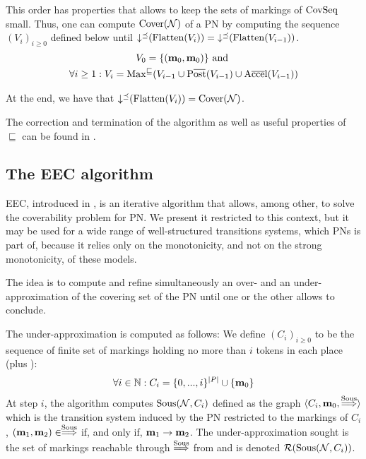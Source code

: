 This order has properties \citep{Geeraerts07} that allows to keep the sets of markings of $\operatorname{CovSeq}$ small.
Thus, one can compute $\operatorname{Cover}(\mathcal{N})$ of a \ac{PN} \NPTm by computing the sequence $(V_i)_{i \geq 0}$ defined below until $\operatorname{\downarrow^\preceq}(\operatorname{Flatten}(V_i)) = \operatorname{\downarrow^\preceq}(\operatorname{Flatten}(V_{i-1}))$.
\begin{gather*}
  V_0 = \{(\mari, \mari)\} \text{ and } \\
  \forall i \geq 1 : V_i = \Maxs(V_{i-1} \cup \Postb(V_{i-1}) \cup \Accelb(V_{i-1}))
\end{gather*}

At the end, we have that $\operatorname{\downarrow^\preceq}(\operatorname{Flatten}(V_i)) = \operatorname{Cover}(\mathcal{N})$.

The correction and termination of the algorithm as well as useful properties of $\sqsubseteq$ can be found in \cite{Geeraerts07, Ganty09}.

\subsection{The \ac{EEC} algorithm}
\label{sec:eec}

\ac{EEC}, introduced in \cite{Geeraerts07thesis, Geeraerts06}, is an iterative algorithm that allows, among other, to solve the coverability problem for \ac{PN}.
We present it restricted to this context, but it may be used for a wide range of well-structured transitions systems, which \acp{PN} is part of, because it relies only on the monotonicity, and not on the strong monotonicity, of these models.

The idea is to compute and refine simultaneously an over- and an under-approximation of the covering set of the \ac{PN} until one or the other allows to conclude.

The under-approximation is computed as follows:
We define $(C_i)_{i \geq 0}$ to be the sequence of finite set of markings holding no more than $i$ tokens in each place (plus \mari):
\[
  \forall i \in \mathbb{N} : C_i = \{0, ..., i\}^{|P|} \cup \{\mathbf{m}_0\}
\]
At step $i$, the algorithm computes $\operatorname{Sous}(\mathcal{N}, C_i)$ defined as the graph $\langle C_i, \mathbf{m}_0, \stackrel{\operatorname{Sous}}{\Longrightarrow} \rangle$ which is the transition system induced by the \ac{PN} \N restricted to the markings of $C_i$,  $(\mathbf{m}_1, \mathbf{m}_2) \in \stackrel{\operatorname{Sous}}{\Longrightarrow}$ if, and only if, $\mathbf{m}_1 \rightarrow \mathbf{m}_2$.
The under-approximation sought is the set of markings reachable through $\stackrel{\operatorname{Sous}}{\Longrightarrow}$ from \mari and is denoted $\operatorname{\mathcal{R}}(\operatorname{Sous}(\mathcal{N}, C_i))$.

